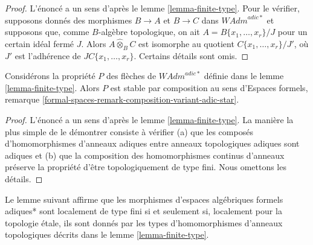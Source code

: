 \begin{proof}
L'énoncé a un sens d'après le lemme \ref{lemma-finite-type}. Pour le vérifier,
supposons donnés des morphismes $B \to A$ et $B \to C$ dans
$\textit{WAdm}^{adic*}$ et supposons que, comme $B$-algèbre topologique, on ait
$A = B\{x_1, \ldots, x_r\}/J$ pour un certain idéal fermé $J$. Alors
$A \widehat{\otimes}_B C$ est isomorphe au quotient
$C\{x_1, \ldots, x_r\}/J'$, où $J'$ est l'adhérence de
$JC\{x_1, \ldots, x_r\}$. Certains détails sont omis.
\end{proof}

\begin{lemma}
\label{lemma-composition-finite-type}
Considérons la propriété $P$ des flèches de $\textit{WAdm}^{adic*}$ définie
dans le lemme \ref{lemma-finite-type}. Alors $P$ est stable par composition au
sens d'Espaces formels, remarque
\ref{formal-spaces-remark-composition-variant-adic-star}.
\end{lemma}

\begin{proof}
L'énoncé a un sens d'après le lemme \ref{lemma-finite-type}. La manière la plus
simple de le démontrer consiste à vérifier (a) que les composés
d'homomorphismes d'anneaux adiques entre anneaux topologiques adiques sont
adiques et (b) que la composition des homomorphismes continus d'anneaux
préserve la propriété d'être topologiquement de type fini. Nous omettons les
détails.
\end{proof}

\noindent
Le lemme suivant affirme que les morphismes d'espaces algébriques formels
adiques* sont localement de type fini si et seulement si, localement pour la
topologie étale, ils sont donnés par les types d'homomorphismes d'anneaux
topologiques décrits dans le lemme \ref{lemma-finite-type}.


